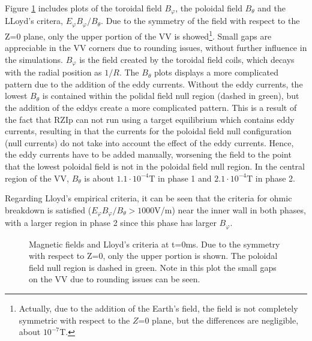 \documentclass[a4paper,12pt,oneside]{book}
\begin{document}
Figure \ref{fig_fields} includes plots of the toroidal field $B_\varphi$, the poloidal field $B_\theta$ and the LLoyd's critera, $E_\varphi B_\varphi/B_\theta$. Due to the symmetry of the field with respect to the Z=0 plane, only the upper portion of the VV is showed\footnote{Actually, due to the addition of the Earth's field, the field is not completely symmetric with respect to the $Z$=0 plane, but the differences are negligible, about $10^{-7}$T.}. Small gaps are appreciable in the VV corners due to rounding issues, without further influence in the simulations. $B_\varphi$ is the field created by the toroidal field coils, which decays with the radial position as $1/R$. The $B_\theta$ plots displays a more complicated pattern due to the addition of the eddy currents. Without the eddy currents, the lowest $B_\theta$ is contained within the polidal field null region (dashed in green), but the addition of the eddys create a more complicated pattern. This is a result of the fact that RZIp can not run using a target equilibrium which contains eddy currents, resulting in that the currents for the poloidal field null configuration (null currents) do not take into account the effect of the eddy currents. Hence, the eddy currents have to be added manually, worsening the field to the point that the lowest poloidal field is not in the poloidal field null region. In the central region of the VV, $B_\theta$ is about $1.1 \cdot 10^{-4} \text{T}$ in phase 1 and $2.1 \cdot 10^{-4} \text{T}$ in phase 2.

Regarding Lloyd's empirical criteria, it can be seen that the criteria for ohmic breakdown is satisfied ($E_\varphi B_\varphi/B_\theta >1000$V/m) near the inner wall in both phases, with a larger region in phase 2 since this phase has larger $B_\varphi$.


\begin{figure}[htbp]
\centering
{}
\hfill
{}

\hfill
{}

\hfill
{}
\caption{Magnetic fields and Lloyd's criteria at t=0ms. Due to the symmetry with respect to Z=0, only the upper portion is shown. The poloidal field null region is dashed in green. Note in this plot the small gaps on the VV due to rounding issues can be seen.}
\label{fig_fields}
\end{figure}
\end{document}
